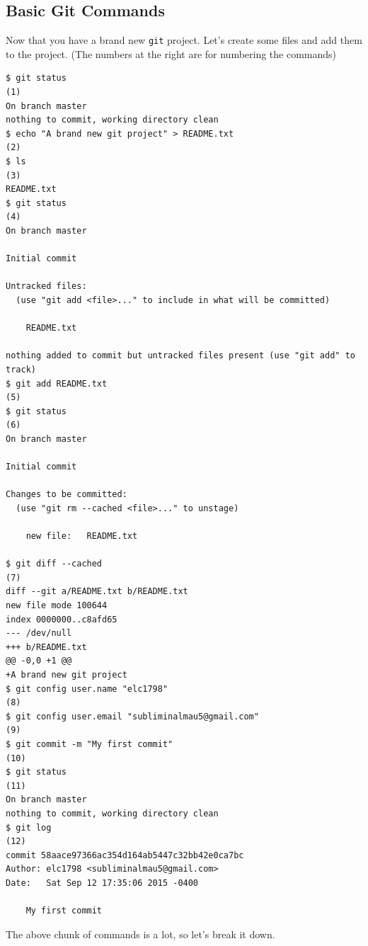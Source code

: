 \documentclass[11pt,fleqn]{article}
\theoremstyle{definition}
\begin{document}
\subsection{Basic Git Commands}
Now that you have a brand new \texttt{git} project. Let's create some files and add them to the project. (The numbers at the right are for numbering the commands)
\begin{verbatim}
$ git status                                                          (1)
On branch master
nothing to commit, working directory clean
$ echo "A brand new git project" > README.txt                         (2)
$ ls                                                                  (3)
README.txt
$ git status                                                          (4)
On branch master

Initial commit

Untracked files:
  (use "git add <file>..." to include in what will be committed)

	README.txt

nothing added to commit but untracked files present (use "git add" to track)
$ git add README.txt                                                  (5)
$ git status                                                          (6)
On branch master

Initial commit

Changes to be committed:
  (use "git rm --cached <file>..." to unstage)

	new file:   README.txt

$ git diff --cached                                                   (7)
diff --git a/README.txt b/README.txt
new file mode 100644
index 0000000..c8afd65
--- /dev/null
+++ b/README.txt
@@ -0,0 +1 @@
+A brand new git project
$ git config user.name "elc1798"                                      (8)
$ git config user.email "subliminalmau5@gmail.com"                    (9)
$ git commit -m "My first commit"                                     (10)
$ git status                                                          (11)
On branch master
nothing to commit, working directory clean
$ git log                                                             (12)
commit 58aace97366ac354d164ab5447c32bb42e0ca7bc
Author: elc1798 <subliminalmau5@gmail.com>
Date:   Sat Sep 12 17:35:06 2015 -0400

    My first commit
\end{verbatim}
The above chunk of commands is a lot, so let's break it down.
\end{document}
